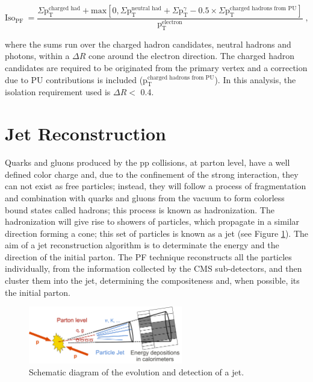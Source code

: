 \begin{equation}
\text{Iso}_{\text{PF}}~= \frac{ \Sigma \text{p}_\text{T}^{\text{charged had}} + \text{max}[0, \Sigma \text{p}_\text{T}^{\text{neutral had}}
+ \Sigma \text{p}_\text{T}^{\gamma} - 0.5 \times \Sigma \text{p}_\text{T}^{\text{charged hadrons from PU}}]}{\text{p}_\text{T}^{\text{electron}}} \;,
\end{equation}

\noindent where the sums run over the charged hadron candidates, neutral hadrons and photons, within
a $\Delta R$ cone around the electron direction. The charged hadron candidates are required to be
originated from the primary vertex \cite{ElectronID8TeV} and a correction due to PU contributions is included 
($\text{p}_\text{T}^{\text{charged hadrons from PU}}$). In this analysis, the isolation requirement used is
$\Delta R <$ 0.4.


\section{Jet Reconstruction}
\label{sec:Jet}

\noindent Quarks and gluons produced by the pp collisions, at parton level, have a 
well defined color charge and, due to the confinement of the strong 
interaction, they can not exist as free particles; instead, they 
will follow a process of fragmentation and combination with quarks and gluons from the vacuum to form 
colorless bound states called hadrons; this process is known as hadronization. The hadronization will 
give rise to showers of particles, which propagate in a similar direction forming a cone; this set 
of particles is known as a jet (see Figure \ref{fig:JetScketch}). The aim of a jet reconstruction 
algorithm is to determinate the energy and the direction of the initial parton. The PF technique 
reconstructs all the particles individually, from the information collected by the CMS sub-detectors,
and then cluster them into the jet, determining the compositeness and, 
when possible, its the initial parton. \\

\begin{figure}[ht]
  \begin{center}
    \includegraphics[width=0.6\textwidth]{figuras/Chapter3/JetSketch.png}
    \caption{Schematic diagram of the evolution and detection of a jet.}
    \label{fig:JetScketch}
  \end{center}
\end{figure}

